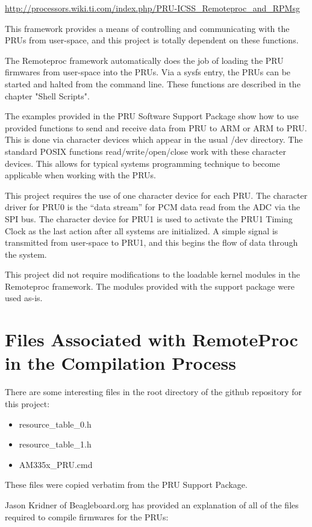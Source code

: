 \url{http://processors.wiki.ti.com/index.php/PRU-ICSS_Remoteproc_and_RPMsg}

This framework provides a means of controlling and communicating with the PRUs from user-space, and this project is totally dependent on these functions.

The Remoteproc framework automatically does the job of loading the PRU firmwares from user-space into the PRUs.  Via a sysfs entry, the PRUs can be started and halted from the command line.  These functions are described in the chapter "Shell Scripts".

The examples provided in the PRU Software Support Package show how to use provided functions to send and receive data from PRU to ARM or ARM to PRU.  This is done via character devices which appear in the usual /dev directory.  The standard POSIX functions read/write/open/close work with these character devices.  This allows for typical systems programming technique to become applicable when working with the PRUs.

This project requires the use of one character device for each PRU.  The character driver for PRU0 is the ``data stream'' for PCM data read from the ADC via the SPI bus.  The character device for PRU1 is used to activate the PRU1 Timing Clock as the last action after all systems are initialized.  A simple signal is transmitted from user-space to PRU1, and this begins the flow of data through the system.

This project did not require modifications to the loadable kernel modules in the Remoteproc framework.  The modules provided with the support package were used as-is.

\section{Files Associated with RemoteProc in the Compilation Process}

There are some interesting files in the root directory of the github repository for this project:

\begin{itemize}
\item resource\_table\_0.h
\item resource\_table\_1.h
\item AM335x\_PRU.cmd
\end{itemize}

These files were copied verbatim from the PRU Support Package.

Jason Kridner of Beagleboard.org has provided an explanation of all of the files required to compile firmwares for the PRUs:

